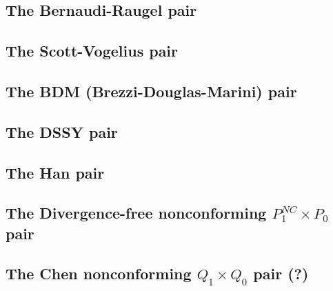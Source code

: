 \subsection{The Bernaudi-Raugel pair} \label{ss:bernaudi_raugel}


\subsection{The Scott-Vogelius pair} \label{ss:scott_vogelius}


\subsection{The BDM (Brezzi-Douglas-Marini) pair} \label{ss:bdm}


\subsection{The DSSY pair} \label{ss:pair_dssy2D}


\subsection{The Han pair} \label{ss:han}


\subsection{The Divergence-free nonconforming $P_1^{NC}\times P_0$ pair} \label{ss:p1ncp0}


\subsection{The Chen nonconforming ${ Q}_1\times Q_0$ pair (?)} \label{ss:chenq0}


